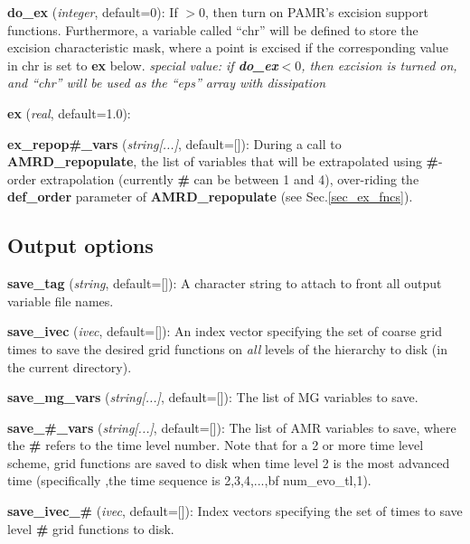 \documentclass[aps,amssymb,unsortedaddress,nofootinbib]{revtex4}
\def\lsep{\itemsep 0.05in}
\begin{document}
\begin{list}{}{\lsep}
\item {\bf do\_ex} ({\em integer}, default=0): If $>0$, then turn on PAMR's excision
      support functions. Furthermore, a variable called ``chr'' will be defined
      to store the excision characteristic mask, where a point is excised 
      if the corresponding value in chr is set to {\bf ex} below.
      {\em special value: if {\bf do\_ex}$<0$, then excision is turned
      on, and ``chr'' will be used as the ``eps'' array with dissipation}
\item {\bf ex} ({\em real}, default=1.0):
\item {\bf ex\_repop\#\_vars} ({\em string[...]}, default=[]):
      During a call to {\bf AMRD\_repopulate}, the list of variables
      that will be extrapolated using {\bf \#}-order extrapolation (currently
      {\bf \#} can be between 1 and 4), over-riding the {\bf def\_order} parameter
      of {\bf AMRD\_repopulate} (see Sec.\ref{sec_ex_fncs}).
\end{list}

\subsection{Output options}

\begin{list}{}{\lsep}
\item {\bf save\_tag} ({\em string}, default=[]): A character string to attach
      to front all output variable file names.
\item {\bf save\_ivec} ({\em ivec}, default=[]): An index vector specifying
      the set of coarse grid times to save the desired grid functions on
      {\em all} levels of the hierarchy to disk (in the current directory).
\item {\bf save\_mg\_vars} ({\em string[...]}, default=[]):
      The list of MG variables to save.
\item {\bf save\_\#\_vars} ({\em string[...]}, default=[]):
      The list of AMR variables to save, where the {\bf \#} refers
      to the time level number. Note that for a 2 or more time level scheme,
      grid functions are saved to disk when time level 2 is the most advanced
      time (specifically ,the time sequence is 2,3,4,...,{bf num\_evo\_tl},1).
\item {\bf save\_ivec\_\#} ({\em ivec}, default=[]): Index vectors specifying
      the set of times to save level {\bf \#} grid functions to disk.
\end{list}
\end{document}
